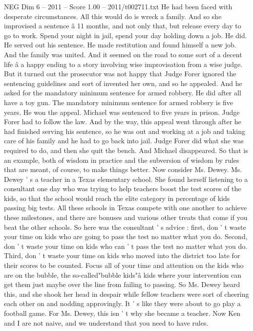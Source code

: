 \begin{textsample}{NEG Dim 6 – 2011 – Score 1.00 – 2011/t002711.txt}
He had been faced with desperate circumstances.
All this would do is wreck a family.
And so she improvised a sentence â 11 months, and not only that, but release every day to go to work.
Spend your night in jail, spend your day holding down a job.
He did.
He served out his sentence.
He made restitution and found himself a new job.
And the family was united.
And it seemed on the road to some sort of a decent life â a happy ending to a story involving wise improvisation from a wise judge.
But it turned out the prosecutor was not happy that Judge Forer ignored the sentencing guidelines and sort of invented her own, and so he appealed.
And he asked for the mandatory minimum sentence for armed robbery.
He did after all have a toy gun.
The mandatory minimum sentence for armed robbery is five years.
He won the appeal.
Michael was sentenced to five years in prison.
Judge Forer had to follow the law.
And by the way, this appeal went through after he had finished serving his sentence, so he was out and working at a job and taking care of his family and he had to go back into jail.
Judge Forer did what she was required to do, and then she quit the bench.
And Michael disappeared.
So that is an example, both of wisdom in practice and the subversion of wisdom by rules that are meant, of course, to make things better.
Now consider Ms.
Dewey.
Ms.
Dewey ' s a teacher in a Texas elementary school.
She found herself listening to a consultant one day who was trying to help teachers boost the test scores of the kids, so that the school would reach the elite category in percentage of kids passing big tests.
All these schools in Texas compete with one another to achieve these milestones, and there are bonuses and various other treats that come if you beat the other schools.
So here was the consultant ' s advice : first, don ' t waste your time on kids who are going to pass the test no matter what you do.
Second, don ' t waste your time on kids who can ' t pass the test no matter what you do.
Third, don ' t waste your time on kids who moved into the district too late for their scores to be counted.
Focus all of your time and attention on the kids who are on the bubble, the so-called"bubble kids"â kids where your intervention can get them just maybe over the line from failing to passing.
So Ms.
Dewey heard this, and she shook her head in despair while fellow teachers were sort of cheering each other on and nodding approvingly.
It ' s like they were about to go play a football game.
For Ms.
Dewey, this isn ' t why she became a teacher.
Now Ken and I are not naive, and we understand that you need to have rules.

\end{textsample}

